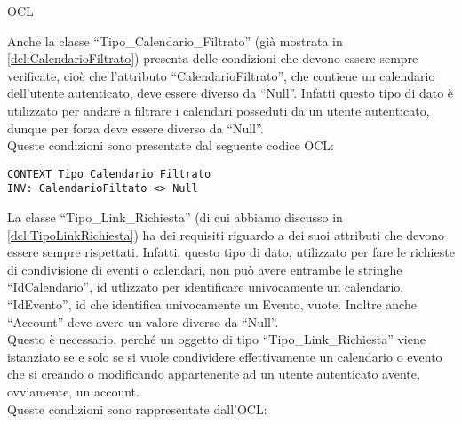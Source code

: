 \begin{listaPersonale}{OCL}
    \begin{center}
        
    \end{center}
    Anche la classe “Tipo\_Calendario\_Filtrato” (già mostrata in \ref{dcl:CalendarioFiltrato}) presenta delle condizioni che devono essere sempre verificate, cioè che l’attributo “CalendarioFiltrato”, che contiene un calendario dell’utente autenticato, deve essere diverso da “Null”. Infatti questo tipo di dato è utilizzato per andare a filtrare i calendari posseduti da un utente autenticato, dunque per forza deve essere diverso da “Null”. \\
    Queste condizioni sono presentate dal seguente codice OCL:
    \begin{lstlisting}
CONTEXT Tipo_Calendario_Filtrato
INV: CalendarioFiltato <> Null
    \end{lstlisting}




    \begin{center}
        
    \end{center}
    La classe “Tipo\_Link\_Richiesta” (di cui abbiamo discusso in \ref{dcl:TipoLinkRichiesta}) ha dei requisiti riguardo a dei suoi attributi che devono essere sempre rispettati. Infatti, questo tipo di dato, utilizzato per fare le richieste di condivisione di eventi o calendari, non può avere entrambe le stringhe “IdCalendario”, id utlizzato per identificare univocamente un calendario, “IdEvento”, id che identifica univocamente un Evento, vuote. Inoltre anche “Account” deve avere un valore diverso da “Null”. \\ Questo è necessario, perché un oggetto di tipo “Tipo\_Link\_Richiesta” viene istanziato se e solo se si vuole condividere effettivamente un calendario o evento che si creando o modificando appartenente ad un utente autenticato avente, ovviamente, un account.\\
    Queste condizioni sono rappresentate dall’OCL:


\end{listaPersonale}
